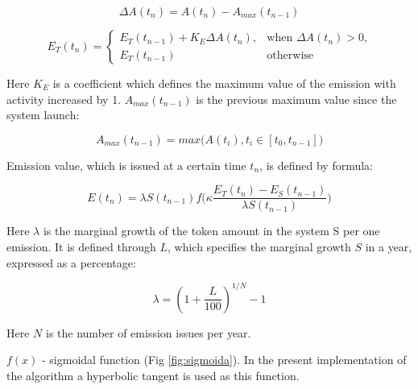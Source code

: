 \documentclass[a4paper,12pt]{article}
\begin{document}
% 

$$
\Delta A(t_n) = A(t_n) - A_{max}(t_{n-1})
$$

$$
E_T(t_n) = \begin{cases}
 E_T(t_{n-1}) + K_E \Delta A(t_n),
 & \text{when $\Delta A(t_n) > 0$,}\\
 E_T(t_{n-1}) & \text{otherwise}
\end{cases}
$$

Here $K_E$ is a coefficient which defines the maximum value of the emission with activity increased by 1. $A_{max}(t_{n-1})$ is the previous maximum value since the system launch:


$$
    A_{max}(t_{n-1}) = max \Big ( A(t_i), t_i \in [t_0, t_{n-1}] \Big )
$$

Emission value, which is issued at a certain time $t_n$, is defined by formula:


$$
    E(t_n) = \lambda S(t_{n-1}) f \Big( \kappa \frac {E_T(t_n) - E_S(t_{n-1})}{\lambda S(t_{n-1})} \Big)
$$

Here $\lambda$ is the marginal growth of the token amount in the system S per one emission. It is defined through $L$, which specifies the marginal growth $S$ in a year, expressed as a percentage:


$$
    \lambda = (1 + \frac{L}{100})^{1/N}-1
$$

Here $N$ is the number of emission issues per year.


$f(x)$ - sigmoidal function (Fig \ref{fig:sigmoida}). In the present implementation of the algorithm a hyperbolic tangent is used as this function. 

\end{document}
